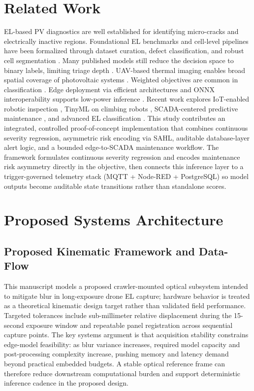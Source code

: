 \documentclass[journal]{IEEEtran}
\begin{document}
\section{Related Work}
EL-based PV diagnostics are well established for identifying micro-cracks and electrically inactive regions. Foundational EL benchmarks and cell-level pipelines have been formalized through dataset curation, defect classification, and robust cell segmentation \cite{BuerhopLutz2018,Deitsch2019,Deitsch2021}. Many published models still reduce the decision space to binary labels, limiting triage depth \cite{Kunaifi2020,Ziegler2022}. UAV-based thermal imaging enables broad spatial coverage of photovoltaic systems \cite{Liao2022}. Weighted objectives are common in classification \cite{Tan2020}. Edge deployment via efficient architectures and ONNX interoperability supports low-power inference \cite{He2016,Sandler2018,Cyphers2020}. Recent work explores IoT-enabled robotic inspection \cite{Kandil2024}, TinyML on climbing robots \cite{Lin2024,Lin2025}, SCADA-centered predictive maintenance \cite{Syamsuddin2024}, and advanced EL classification \cite{Ebied2025}. This study contributes an integrated, controlled proof-of-concept implementation that combines continuous severity regression, asymmetric risk encoding via SAHL, auditable database-layer alert logic, and a bounded edge-to-SCADA maintenance workflow. The framework formulates continuous severity regression and encodes maintenance risk asymmetry directly in the objective, then connects this inference layer to a trigger-governed telemetry stack (MQTT + Node-RED + PostgreSQL) so model outputs become auditable state transitions rather than standalone scores.

\section{Proposed Systems Architecture}\label{sec:architecture}

\subsection{Proposed Kinematic Framework and Data-Flow}
This manuscript models a proposed crawler-mounted optical subsystem intended to mitigate blur in long-exposure drone EL capture; hardware behavior is treated as a theoretical kinematic design target rather than validated field performance. Targeted tolerances include sub-millimeter relative displacement during the 15-second exposure window and repeatable panel registration across sequential capture points. The key systems argument is that acquisition stability constrains edge-model feasibility: as blur variance increases, required model capacity and post-processing complexity increase, pushing memory and latency demand beyond practical embedded budgets. A stable optical reference frame can therefore reduce downstream computational burden and support deterministic inference cadence in the proposed design.
\end{document}
